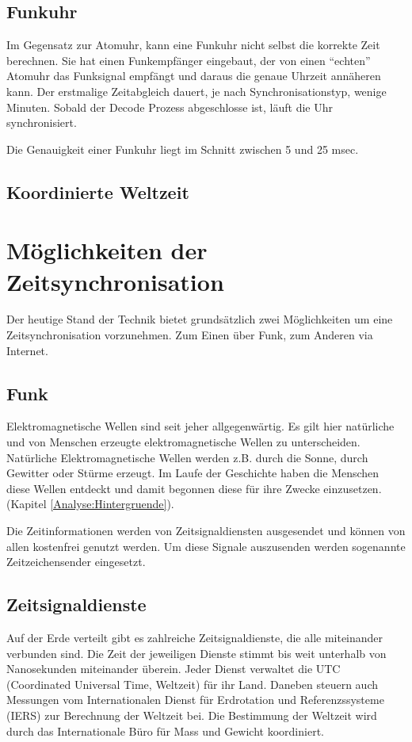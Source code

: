\subsection{Funkuhr}
Im Gegensatz zur Atomuhr, kann eine Funkuhr nicht selbst die korrekte Zeit berechnen. Sie hat einen Funkempfänger eingebaut, der von einen "`echten"' Atomuhr das Funksignal empfängt und daraus die genaue Uhrzeit annäheren kann. Der erstmalige Zeitabgleich dauert, je nach Synchronisationstyp, wenige Minuten. Sobald der Decode Prozess abgeschlosse ist, läuft die Uhr synchronisiert.

Die Genauigkeit einer Funkuhr liegt im Schnitt zwischen 5 und 25 msec.


\subsection{Koordinierte Weltzeit}

\section{Möglichkeiten der Zeitsynchronisation}
Der heutige Stand der Technik bietet grundsätzlich zwei Möglichkeiten um eine Zeitsynchronisation vorzunehmen. Zum Einen über Funk, zum Anderen via Internet.

\subsection{Funk}
Elektromagnetische Wellen sind seit jeher allgegenwärtig. Es gilt hier natürliche und von Menschen erzeugte elektromagnetische Wellen zu unterscheiden. Natürliche Elektromagnetische Wellen werden z.B. durch die Sonne, durch Gewitter oder Stürme erzeugt. Im Laufe der Geschichte haben die Menschen diese Wellen entdeckt und damit begonnen diese für ihre Zwecke einzusetzen. (Kapitel \ref{Analyse:Hintergruende}).

Die Zeitinformationen werden von Zeitsignaldiensten ausgesendet und können von allen kostenfrei genutzt werden. Um diese Signale auszusenden werden sogenannte Zeitzeichensender eingesetzt. 

\subsection{Zeitsignaldienste}
Auf der Erde verteilt gibt es zahlreiche Zeitsignaldienste, die alle miteinander verbunden sind. Die Zeit der jeweiligen Dienste stimmt bis weit unterhalb von Nanosekunden miteinander überein. Jeder Dienst verwaltet die UTC (Coordinated Universal Time, Weltzeit) für ihr Land. Daneben steuern auch Messungen vom Internationalen Dienst für Erdrotation und Referenzssysteme (IERS) zur Berechnung der Weltzeit bei.
Die Bestimmung der Weltzeit wird durch das Internationale Büro für Mass und Gewicht koordiniert. 


